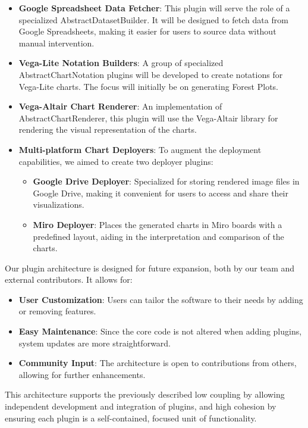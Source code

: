 \begin{itemize}
\item
  \textbf{Google Spreadsheet Data Fetcher}: This plugin will serve the
  role of a specialized AbstractDatasetBuilder. It will be designed to
  fetch data from Google Spreadsheets, making it easier for users to
  source data without manual intervention.
\item
  \textbf{Vega-Lite Notation Builders}: A group of specialized
  AbstractChartNotation plugins will be developed to create notations
  for Vega-Lite charts. The focus will initially be on generating Forest
  Plots.
\item
  \textbf{Vega-Altair Chart Renderer}: An implementation of
  AbstractChartRenderer, this plugin will use the Vega-Altair library
  for rendering the visual representation of the charts.
\item
  \textbf{Multi-platform Chart Deployers}: To augment the deployment
  capabilities, we aimed to create two deployer plugins:

  \begin{itemize}
  \item
    \textbf{Google Drive Deployer}: Specialized for storing rendered
    image files in Google Drive, making it convenient for users to
    access and share their visualizations.
  \item
    \textbf{Miro Deployer}: Places the generated charts in Miro boards
    with a predefined layout, aiding in the interpretation and
    comparison of the charts.
  \end{itemize}
\end{itemize}

Our plugin architecture is designed for future expansion, both by our
team and external contributors. It allows for:

\begin{itemize}
\item
  \textbf{User Customization}: Users can tailor the software to their
  needs by adding or removing features.
\item
  \textbf{Easy Maintenance}: Since the core code is not altered when
  adding plugins, system updates are more straightforward.
\item
  \textbf{Community Input}: The architecture is open to contributions
  from others, allowing for further enhancements.
\end{itemize}

This architecture supports the previously described low coupling by
allowing independent development and integration of plugins, and high
cohesion by ensuring each plugin is a self-contained, focused unit of
functionality.


